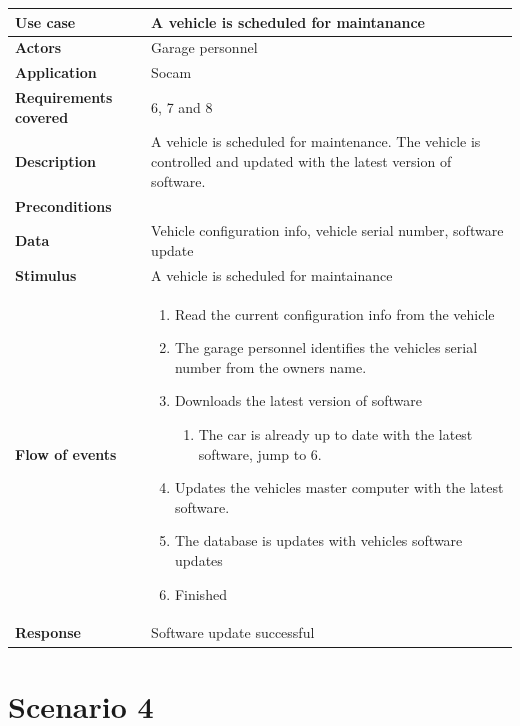 		\begin{table}[H]
		\begin{tabular}{ p{4cm} | p{10cm} }
			\hline
			\rowcolor{gray}
			{\bf Use case} & {\bf A vehicle is scheduled for maintanance} \\ \hline
			{\bf Actors} & Garage personnel\\ \hline
			{\bf Application} & Socam \\ \hline
			{\bf Requirements covered} & 6, 7 and 8 \\ \hline
			{\bf Description} & A vehicle is scheduled for maintenance. The vehicle 
			is controlled and updated with the latest version of software. \\ \hline
			{\bf Preconditions} & \\ \hline
			{\bf Data} & Vehicle configuration info, vehicle serial number, software update \\ \hline
			{\bf Stimulus} & A vehicle is scheduled for maintainance \\ \hline
			{\bf Flow of events} & 
				\begin{enumerate}[font=\bfseries]
					\item Read the current configuration info from the vehicle
					\item The garage personnel identifies the vehicles serial 
					number from the owners name.
					\item Downloads the latest version of software 
						\begin{enumerate}[label*=\arabic*., font=\bfseries]
							\item The car is already up to date with the latest software, jump to 6.
						\end{enumerate}
					\item Updates the vehicles master computer with the latest software.
					\item The database is updates with vehicles software updates
					\item Finished
				\end{enumerate}
			
			\\ \hline
			{\bf Response} & Software update successful  \\ \hline

		\end{tabular}
	\end{table}


\clearpage
\section{Scenario 4}

